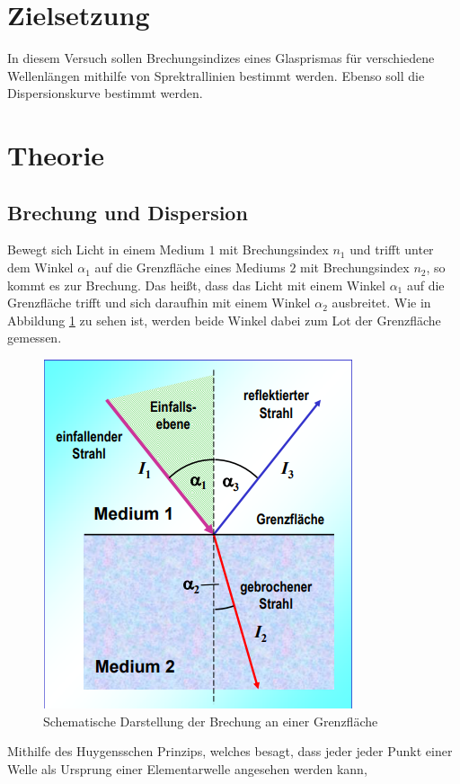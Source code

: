 \section{Zielsetzung}
\label{sec:Zielsetzung}

In diesem Versuch sollen Brechungsindizes eines Glasprismas für verschiedene Wellenlängen mithilfe von Sprektrallinien bestimmt werden.
Ebenso soll die Dispersionskurve bestimmt werden.

\section{Theorie}
\subsection{Brechung und Dispersion}
Bewegt sich Licht in einem Medium $1$ mit Brechungsindex $n_1$ und trifft unter dem Winkel $\alpha_1$
auf die Grenzfläche eines Mediums $2$ mit Brechungsindex $n_2$, so kommt es zur Brechung.
Das heißt, dass das Licht mit einem Winkel $\alpha_1$ auf die Grenzfläche trifft und sich daraufhin mit einem
Winkel $\alpha_2$ ausbreitet.
Wie in Abbildung \ref{fig:brech} zu sehen ist, werden beide Winkel dabei zum Lot der Grenzfläche gemessen.
\begin{figure}[H]
  \centering
  \includegraphics[scale=0.7]{Text/Bilder/Brechung2.PNG}
  \caption{Schematische Darstellung der Brechung an einer Grenzfläche \cite[948]{sample3}}
  \label{fig:brech}
\end{figure}
Mithilfe des Huygensschen Prinzips, welches besagt, dass jeder jeder Punkt einer Welle als Ursprung einer Elementarwelle angesehen werden kann,
